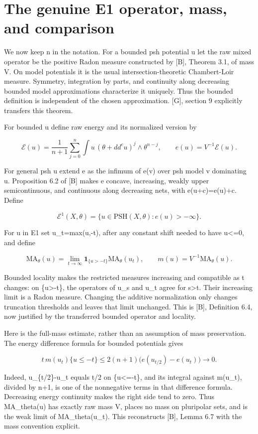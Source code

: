 \documentclass[11pt]{article}
\begin{document}
\section{The genuine E1 operator, mass, and comparison}

We now keep n in the notation. For a bounded psh potential u let the raw mixed operator be the positive Radon measure constructed by [B], Theorem 3.1, of mass V. On model potentials it is the usual intersection-theoretic Chambert-Loir measure. Symmetry, integration by parts, and continuity along decreasing bounded model approximations characterize it uniquely. Thus the bounded definition is independent of the chosen approximation. [G], section 9 explicitly transfers this theorem.

For bounded u define raw energy and its normalized version by

\[
\mathcal E(u)=\frac1{n+1}\sum_{j=0}^n
\int u\,(\theta+dd^cu)^j\wedge\theta^{n-j},\qquad
e(u)=V^{-1}\mathcal E(u).
\]

For general psh u extend e as the infimum of e(v) over psh model v dominating u. Proposition 6.2 of [B] makes e concave, increasing, weakly upper semicontinuous, and continuous along decreasing nets, with e(u+c)=e(u)+c. Define

\[
\mathcal E^1(X,\theta)=\{u\in\mathrm{PSH}(X,\theta):e(u)>-\infty\}.
\]

For u in E1 set u\_t=max(u,-t), after any constant shift needed to have u\textless{}=0, and define

\[
\mathrm{MA}_\theta(u)=\lim_{t\to\infty}
\mathbf1_{\{u>-t\}}\mathrm{MA}_\theta(u_t),\qquad
m(u)=V^{-1}\mathrm{MA}_\theta(u).
\]

Bounded locality makes the restricted measures increasing and compatible as t changes: on \{u\textgreater{}-t\}, the operators of u\_s and u\_t agree for s\textgreater{}t. Their increasing limit is a Radon measure. Changing the additive normalization only changes truncation thresholds and leaves that limit unchanged. This is [B], Definition 6.4, now justified by the transferred bounded operator and locality.

Here is the full-mass estimate, rather than an assumption of mass preservation. The energy difference formula for bounded potentials gives

\[
t\,m(u_t)\{u\leq-t\}
\leq2(n+1)\bigl(e(u_{t/2})-e(u_t)\bigr)\longrightarrow0.
\]

Indeed, u\_\{t/2\}-u\_t equals t/2 on \{u\textless{}=-t\}, and its integral against m(u\_t), divided by n+1, is one of the nonnegative terms in that difference formula. Decreasing energy continuity makes the right side tend to zero. Thus MA\_theta(u) has exactly raw mass V, places no mass on pluripolar sets, and is the weak limit of MA\_theta(u\_t). This reconstructs [B], Lemma 6.7 with the mass convention explicit.
\end{document}
